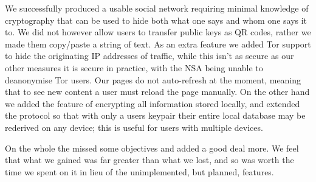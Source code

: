 We successfully produced a usable social network requiring minimal knowledge of
cryptography that can be used to hide both what one says and whom one says it
to. We did not however allow users to transfer public keys as QR codes, rather
we made them copy/paste a string of text. As an extra feature we added Tor
support to hide the originating IP addresses of traffic, while this isn't as
secure as our other measures it is secure in practice, with the NSA being unable
to deanonymise Tor users\cite{torStinks}. Our pages do not auto-refresh at the
moment, meaning that to see new content a user must reload the page manually.
On the other hand we added the feature of encrypting all information stored
locally, and extended the protocol so that with only a users keypair their
entire local database may be rederived on any device; this is useful for users
with multiple devices.


On the whole the missed some objectives and added a good deal more. We feel that
what we gained was far greater than what we lost, and so was worth the time we
spent on it in lieu of the unimplemented, but planned, features.
